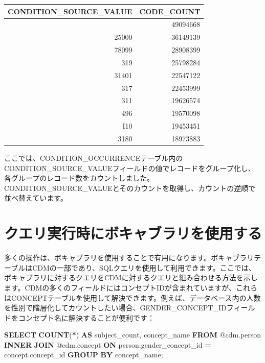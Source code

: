\documentclass[
  11pt]{book}
\newenvironment{Shaded}{\begin{snugshade}}{\end{snugshade}}
\newcommand{\FunctionTok}[1]{\textcolor[rgb]{0.13,0.29,0.53}{\textbf{#1}}}
\newcommand{\KeywordTok}[1]{\textcolor[rgb]{0.13,0.29,0.53}{\textbf{#1}}}
\newcommand{\NormalTok}[1]{#1}
\newcommand{\OperatorTok}[1]{\textcolor[rgb]{0.81,0.36,0.00}{\textbf{#1}}}
\theoremstyle{definition}
\theoremstyle{definition}
\theoremstyle{definition}
\theoremstyle{definition}
\theoremstyle{remark}
\begin{document}
\begin{longtable}[]{@{}rr@{}}
\toprule\noalign{}
CONDITION\_SOURCE\_VALUE & CODE\_COUNT \\
\midrule\noalign{}
\endhead
\bottomrule\noalign{}
\endlastfoot
4019 & 49094668 \\
25000 & 36149139 \\
78099 & 28908399 \\
319 & 25798284 \\
31401 & 22547122 \\
317 & 22453999 \\
311 & 19626574 \\
496 & 19570098 \\
I10 & 19453451 \\
3180 & 18973883 \\
\end{longtable}

ここでは、CONDITION\_OCCURRENCEテーブル内のCONDITION\_SOURCE\_VALUEフィールドの値でレコードをグループ化し、各グループのレコード数をカウントしました。CONDITION\_SOURCE\_VALUEとそのカウントを取得し、カウントの逆順で並べ替えています。

\section{クエリ実行時にボキャブラリを使用する}\label{ux30afux30a8ux30eaux5b9fux884cux6642ux306bux30dcux30adux30e3ux30d6ux30e9ux30eaux3092ux4f7fux7528ux3059ux308b}

多くの操作は、ボキャブラリを使用することで有用になります。ボキャブラリテーブルはCDMの一部であり、SQLクエリを使用して利用できます。ここでは、ボキャブラリに対するクエリをCDMに対するクエリと組み合わせる方法を示します。CDMの多くのフィールドにはコンセプトIDが含まれていますが、これらはCONCEPTテーブルを使用して解決できます。例えば、データベース内の人数を性別で階層化してカウントしたい場合、GENDER\_CONCEPT\_IDフィールドをコンセプト名に解決することが便利です：

\begin{Shaded}
\begin{Highlighting}[]
\KeywordTok{SELECT} \FunctionTok{COUNT}\NormalTok{(}\OperatorTok{*}\NormalTok{) }\KeywordTok{AS}\NormalTok{ subject\_count,}
\NormalTok{  concept\_name}
\KeywordTok{FROM}\NormalTok{ @cdm.person}
\KeywordTok{INNER} \KeywordTok{JOIN}\NormalTok{ @cdm.concept}
  \KeywordTok{ON}\NormalTok{ person.gender\_concept\_id }\OperatorTok{=}\NormalTok{ concept.concept\_id}
\KeywordTok{GROUP} \KeywordTok{BY}\NormalTok{ concept\_name;}
\end{Highlighting}
\end{Shaded}
\end{document}
